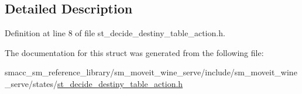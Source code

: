 \subsection{Detailed Description}


Definition at line 8 of file st\+\_\+decide\+\_\+destiny\+\_\+table\+\_\+action.\+h.



The documentation for this struct was generated from the following file\+:\begin{DoxyCompactItemize}
\item 
smacc\+\_\+sm\+\_\+reference\+\_\+library/sm\+\_\+moveit\+\_\+wine\+\_\+serve/include/sm\+\_\+moveit\+\_\+wine\+\_\+serve/states/\hyperlink{st__decide__destiny__table__action_8h}{st\+\_\+decide\+\_\+destiny\+\_\+table\+\_\+action.\+h}\end{DoxyCompactItemize}
